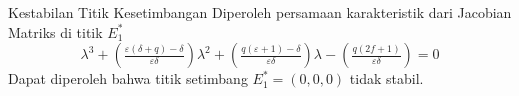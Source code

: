 \documentclass[aspectratio=169]{beamer}
\begin{document}


\begin{frame}{Kestabilan Titik Kesetimbangan}
    Diperoleh persamaan karakteristik dari Jacobian Matriks di titik $E_1^{*}$
    \begin{equation*}
        \lambda^3 + \left( \tfrac{\varepsilon(\delta+q)-\delta}{\varepsilon \delta} \right)\lambda^2 + \left( \tfrac{q(\varepsilon+1)-\delta}{\varepsilon \delta}\right)\lambda-\left( \tfrac{q(2f+1)}{\varepsilon \delta}\right)=0
    \end{equation*}
    Dapat diperoleh bahwa titik setimbang $E_1^*=(0,0,0)$ tidak stabil. 
\end{frame}
\end{document}
